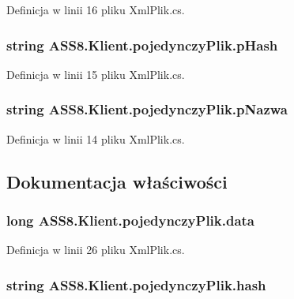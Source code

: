 Definicja w linii 16 pliku XmlPlik.cs.\hypertarget{a00020_13cf9026e491442d7261370a14956892}{
\subsubsection[{pHash}]{\setlength{\rightskip}{0pt plus 5cm}string {\bf ASS8.Klient.pojedynczyPlik.pHash}}}
\label{db/db2/a00020_13cf9026e491442d7261370a14956892}




Definicja w linii 15 pliku XmlPlik.cs.\hypertarget{a00020_4f4c391d3e233b965d3eb42ee93d52a5}{
\subsubsection[{pNazwa}]{\setlength{\rightskip}{0pt plus 5cm}string {\bf ASS8.Klient.pojedynczyPlik.pNazwa}}}
\label{db/db2/a00020_4f4c391d3e233b965d3eb42ee93d52a5}




Definicja w linii 14 pliku XmlPlik.cs.

\subsection{Dokumentacja właściwości}
\hypertarget{a00020_120fea65780ab33942c7d28c6443cfdf}{
\subsubsection[{data}]{\setlength{\rightskip}{0pt plus 5cm}long ASS8.Klient.pojedynczyPlik.data}}
\label{db/db2/a00020_120fea65780ab33942c7d28c6443cfdf}




Definicja w linii 26 pliku XmlPlik.cs.\hypertarget{a00020_e211a903ec9f14ec1e4cc1652ce6ce54}{
\subsubsection[{hash}]{\setlength{\rightskip}{0pt plus 5cm}string ASS8.Klient.pojedynczyPlik.hash}}
\label{db/db2/a00020_e211a903ec9f14ec1e4cc1652ce6ce54}




